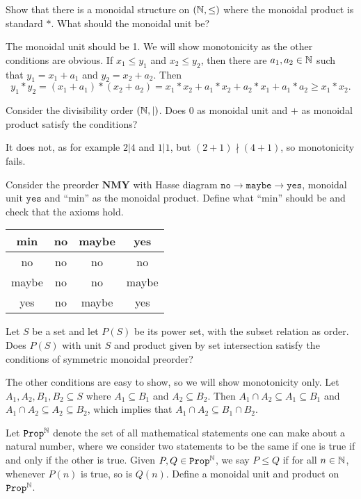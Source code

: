 Show that there is a monoidal structure on $(\mathbb{N}, \leq)$ where the monoidal product is standard $*$.  What should the monoidal unit be?

\solution
The monoidal unit should be 1.  We will show monotonicity as the other conditions are obvious.  If $x_1\leq y_1$ and $x_2\leq y_2$, then there are $a_1,a_2\in\mathbb{N}$ such that $y_1 = x_1+a_1$ and $y_2=x_2+a_2$.  Then
$$y_1 * y_2 = (x_1 + a_1) * (x_2 + a_2)= x_1*x_2+a_1*x_2 + a_2*x_1 + a_1*a_2\geq x_1*x_2.$$

Consider the divisibility order $(\mathbb{N}, |)$.  Does $0$ as monoidal unit and $+$ as monoidal product satisfy the conditions?

\solution
It does not, as for example $2|4$ and $1|1$, but $(2+1)\nmid(4+1)$, so monotonicity fails.

Consider the preorder $\textbf{NMY}$ with Hasse diagram $\texttt{no}\to\texttt{maybe}\to\texttt{yes}$, monoidal unit $\texttt{yes}$ and ``min'' as the monoidal product.  Define what ``min'' should be and check that the axioms hold.

\solution
\begin{tabular}{c|ccc} 
min & no & maybe & yes \\
\hline no & no & no & no \\
maybe & no & no & maybe \\
yes & no & maybe & yes
\end{tabular}

Let $S$ be a set and let $P(S)$ be its power set, with the subset relation as order.  Does $P(S)$ with unit $S$ and product given by set intersection satisfy the conditions of symmetric monoidal preorder?

\solution
The other conditions are easy to show, so we will show monotonicity only.  Let $A_1, A_2, B_1, B_2\subseteq S$ where $A_1\subseteq B_1$ and $A_2\subseteq B_2$.  Then $A_1\cap A_2 \subseteq A_1\subseteq B_1$ and $A_1\cap A_2\subseteq A_2\subseteq B_2$, which implies that $A_1\cap A_2\subseteq B_1\cap B_2$.

Let $\texttt{Prop}^{\mathbb{N}}$ denote the set of all mathematical statements one can make about a natural number, where we consider two statements to be the same if one is true if and only if the other is true.  Given $P,Q\in\texttt{Prop}^{\mathbb{N}}$, we say $P\leq Q$ if for all $n\in\mathbb{N}$, whenever $P(n)$ is true, so is $Q(n)$.  Define a monoidal unit and product on $\texttt{Prop}^{\mathbb{N}}$.

